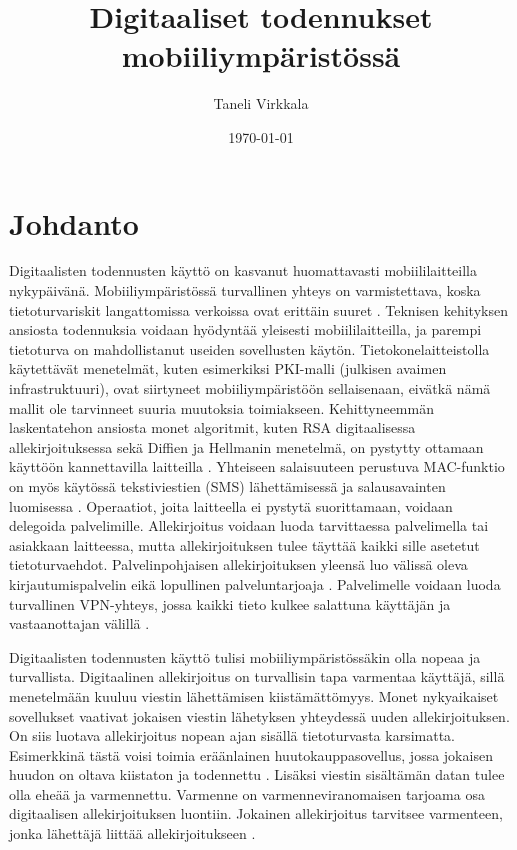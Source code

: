 \documentclass[finnish]{tktltiki2}
\title{Digitaaliset todennukset mobiiliympäristössä}
\author{Taneli Virkkala}
\date{\today}
\theoremstyle{definition}
\theoremstyle{remark}
\begin{document}

\frontmatter      %

\maketitle        %
\makeabstract     %

\tableofcontents  %


\mainmatter       %

\section{Johdanto}



Digitaalisten todennusten käyttö on kasvanut huomattavasti mobiililaitteilla nykypäivänä. Mobiiliympäristössä turvallinen yhteys on varmistettava, koska tietoturvariskit langattomissa verkoissa ovat erittäin suuret \cite{enti}. Teknisen kehityksen ansiosta todennuksia voidaan hyödyntää yleisesti mobiililaitteilla, ja parempi tietoturva on mahdollistanut useiden sovellusten käytön. Tietokonelaitteistolla käytettävät menetelmät, kuten esimerkiksi PKI-malli (julkisen avaimen infrastruktuuri), ovat siirtyneet mobiiliympäristöön sellaisenaan, eivätkä nämä mallit ole tarvinneet suuria muutoksia toimiakseen. Kehittyneemmän laskentatehon ansiosta monet algoritmit, kuten RSA digitaalisessa allekirjoituksessa sekä Diffien ja Hellmanin menetelmä, on pystytty ottamaan käyttöön kannettavilla laitteilla \cite{enti}. Yhteiseen salaisuuteen perustuva MAC-funktio on myös käytössä tekstiviestien (SMS) lähettämisessä \cite{MAC} ja salausavainten luomisessa \cite{MACA}. Operaatiot, joita laitteella ei pystytä suorittamaan, voidaan delegoida palvelimille. Allekirjoitus voidaan luoda tarvittaessa palvelimella tai asiakkaan laitteessa, mutta allekirjoituksen tulee täyttää kaikki sille asetetut tietoturvaehdot. Palvelinpohjaisen allekirjoituksen yleensä luo välissä oleva kirjautumispalvelin eikä lopullinen palveluntarjoaja \cite{proxy}. Palvelimelle voidaan luoda turvallinen VPN-yhteys, jossa kaikki tieto kulkee salattuna käyttäjän ja vastaanottajan välillä \cite{vpn}.

Digitaalisten todennusten käyttö tulisi mobiiliympäristössäkin  olla nopeaa ja turvallista. Digitaalinen allekirjoitus on turvallisin tapa varmentaa käyttäjä, sillä menetelmään kuuluu viestin lähettämisen kiistämättömyys. Monet nykyaikaiset sovellukset vaativat jokaisen viestin lähetyksen yhteydessä uuden allekirjoituksen. On siis luotava allekirjoitus nopean ajan sisällä tietoturvasta karsimatta. Esimerkkinä tästä voisi toimia eräänlainen huutokauppasovellus, jossa jokaisen huudon on oltava kiistaton ja todennettu \cite{proxy}. Lisäksi viestin sisältämän datan tulee olla eheää ja varmennettu. Varmenne on varmenneviranomaisen tarjoama osa digitaalisen allekirjoituksen luontiin. Jokainen allekirjoitus tarvitsee varmenteen, jonka lähettäjä liittää allekirjoitukseen \cite{ECC}.   
\end{document}
